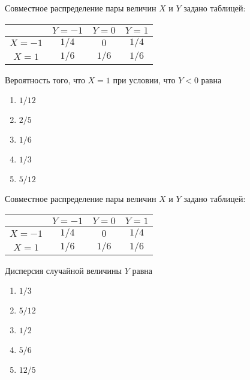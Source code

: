 \documentclass[t]{beamer}
\begin{document}
 \begin{frame} \label{14} 
\begin{block}{14} 

Совместное распределение пары величин $X$ и $Y$ задано таблицей:
\begin{center}
\begin{tabular}{@{}c|ccc@{}}
\toprule
       & $Y=-1$ & $Y=0$ & $Y=1$ \\ \midrule
$X=-1$ & $1/4$  & $0$   & $1/4$ \\
$X=1$  & $1/6$  & $1/6$ & $1/6$ \\ \bottomrule
\end{tabular}
\end{center}
\vspace{0.5cm} 
 
 
Вероятность того, что $X=1$ при условии, что $Y<0$ равна
 


 \end{block} 
\begin{enumerate} 
\item[] \hyperlink{14-No}{\beamergotobutton{} $1/12$}
\item[] \hyperlink{14-Yes}{\beamergotobutton{} $2/5$}
\item[] \hyperlink{14-No}{\beamergotobutton{} $1/6$}
\item[] \hyperlink{14-No}{\beamergotobutton{} $1/3$
}
\item[] \hyperlink{14-No}{\beamergotobutton{} $5/12$}
\end{enumerate} 
\end{frame} 


 \begin{frame} \label{15} 
\begin{block}{15} 

Совместное распределение пары величин $X$ и $Y$ задано таблицей:
\begin{center}
\begin{tabular}{@{}c|ccc@{}}
\toprule
       & $Y=-1$ & $Y=0$ & $Y=1$ \\ \midrule
$X=-1$ & $1/4$  & $0$   & $1/4$ \\
$X=1$  & $1/6$  & $1/6$ & $1/6$ \\ \bottomrule
\end{tabular}
\end{center}
\vspace{0.5cm} 
 
 
Дисперсия случайной величины $Y$  равна
 


 \end{block} 
\begin{enumerate} 
\item[] \hyperlink{15-No}{\beamergotobutton{} $1/3$}
\item[] \hyperlink{15-No}{\beamergotobutton{} $5/12$}
\item[] \hyperlink{15-No}{\beamergotobutton{} $1/2$}
\item[] \hyperlink{15-Yes}{\beamergotobutton{} $5/6$}
\item[] \hyperlink{15-No}{\beamergotobutton{} $12/5$
}
\end{enumerate} 
\end{frame} 
\end{document}
